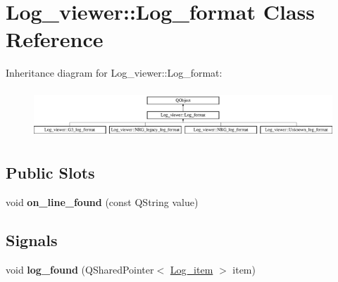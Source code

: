 \hypertarget{class_log__viewer_1_1_log__format}{\section{Log\-\_\-viewer\-:\-:Log\-\_\-format Class Reference}
\label{class_log__viewer_1_1_log__format}
}
Inheritance diagram for Log\-\_\-viewer\-:\-:Log\-\_\-format\-:\begin{figure}[H]
\begin{center}
\leavevmode
\includegraphics[height=1.834061cm]{class_log__viewer_1_1_log__format}
\end{center}
\end{figure}
\subsection*{Public Slots}
\begin{DoxyCompactItemize}
\item 
\hypertarget{class_log__viewer_1_1_log__format_a8f78b9e76b3dda71bbb5623baf4bcceb}{void {\bfseries on\-\_\-line\-\_\-found} (const Q\-String value)}\label{class_log__viewer_1_1_log__format_a8f78b9e76b3dda71bbb5623baf4bcceb}

\end{DoxyCompactItemize}
\subsection*{Signals}
\begin{DoxyCompactItemize}
\item 
\hypertarget{class_log__viewer_1_1_log__format_a7fa71ac3f12445ddb387a53343eddd6a}{void {\bfseries log\-\_\-found} (Q\-Shared\-Pointer$<$ \hyperlink{class_log__viewer_1_1_log__item}{Log\-\_\-item} $>$ item)}\label{class_log__viewer_1_1_log__format_a7fa71ac3f12445ddb387a53343eddd6a}

\end{DoxyCompactItemize}
